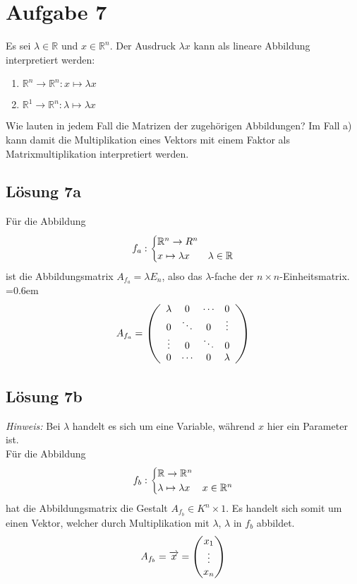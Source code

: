 \documentclass[main.tex]{subfiles}
\begin{document}
\section{Aufgabe 7}
Es sei $\lambda \in \mathbb{R}$ und $x \in \mathbb{R}^n$. Der Ausdruck $\lambda x$ kann als lineare Abbildung interpretiert werden:
\begin{enumerate}
    \item $\mathbb{R}^n \to \mathbb{R}^n : x \mapsto \lambda x$
    \item $\mathbb{R}^1 \to \mathbb{R}^n : \lambda \mapsto \lambda x$
\end{enumerate}

Wie lauten in jedem Fall die Matrizen der zugehörigen Abbildungen? Im Fall a) kann damit die Multiplikation eines Vektors mit einem Faktor als Matrixmultiplikation interpretiert werden.

\subsection{Lösung 7a}
Für die Abbildung 
$$
    f_a: \begin{cases}
        \R^n \to R^n\\
        x \mapsto \lambda x & \lambda \in \R
    \end{cases}
$$
ist die Abbildungsmatrix $A_{f_a} = \lambda E_n$, also das $\lambda$-fache der $n\times n$-Einheitsmatrix.
\arraycolsep=0.6em\def\arraystretch{1}
$$
A_{f_a} = \eqmatrix{cccc}{
    \lambda &      0 & \cdots & 0 \\
          0 & \ddots &      0 & \vdots \\
     \vdots &      0 & \ddots & 0 \\
          0 & \cdots & 0 & \lambda}
$$

\subsection{Lösung 7b}
\textit{Hinweis:} Bei $\lambda$ handelt es sich um eine Variable, während $x$ hier ein Parameter ist. \\
Für die Abbildung 
$$
    f_b: \begin{cases}
        \R \to \R^n\\
        \lambda \mapsto \lambda x & x \in \R^n
    \end{cases}
$$
hat die Abbildungsmatrix die Gestalt $A_{f_b} \in K^n\times 1$. Es handelt sich somit um einen Vektor, welcher durch Multiplikation mit $\lambda$, $\lambda$ in $f_b$ abbildet.
$$
    A_{f_b} = \vec{x} = \vektor{x_1 \\ \vdots \\ x_n}
$$
\end{document}
